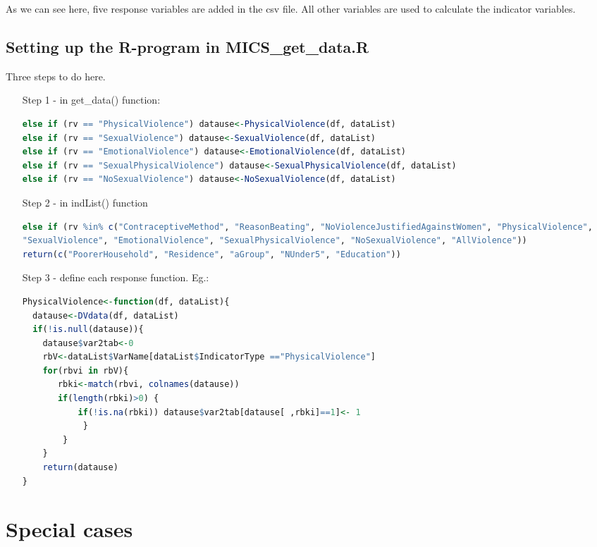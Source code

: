 \documentclass[12pt]{article}
\begin{document}
As we can see here, five response variables are added in the csv file. All other variables are used to calculate the indicator variables.

\subsection{Setting up the R-program in MICS\_get\_data.R}

Three steps to do here.

\begin{enumerate}
	\item[Step 1 -] in get\_data() function:
	\hfill \break
	
	{\small 
		\begin{lstlisting}[language=R]
else if (rv == "PhysicalViolence") datause<-PhysicalViolence(df, dataList)
else if (rv == "SexualViolence") datause<-SexualViolence(df, dataList)
else if (rv == "EmotionalViolence") datause<-EmotionalViolence(df, dataList)
else if (rv == "SexualPhysicalViolence") datause<-SexualPhysicalViolence(df, dataList)
else if (rv == "NoSexualViolence") datause<-NoSexualViolence(df, dataList)
		\end{lstlisting}
	}
\item[Step 2 -]	 in indList() function
	\hfill \break

{\small 
	\begin{lstlisting}[language=R]
else if (rv %in% c("ContraceptiveMethod", "ReasonBeating", "NoViolenceJustifiedAgainstWomen", "PhysicalViolence", 
"SexualViolence", "EmotionalViolence", "SexualPhysicalViolence", "NoSexualViolence", "AllViolence"))
return(c("PoorerHousehold", "Residence", "aGroup", "NUnder5", "Education"))	
	\end{lstlisting}
}
	\item[Step 3 -]	 define each response function. Eg.:
	\hfill \break
	
	{\small 
		\begin{lstlisting}[language=R]	
PhysicalViolence<-function(df, dataList){
  datause<-DVdata(df, dataList)
  if(!is.null(datause)){
	datause$var2tab<-0
	rbV<-dataList$VarName[dataList$IndicatorType =="PhysicalViolence"]
	for(rbvi in rbV){
	   rbki<-match(rbvi, colnames(datause))
	   if(length(rbki)>0) {
		   if(!is.na(rbki)) datause$var2tab[datause[ ,rbki]==1]<- 1 
			}
		}
	}
	return(datause)
}	
		\end{lstlisting}
	}
\end{enumerate}

	
\section{Special cases}
\end{document}
